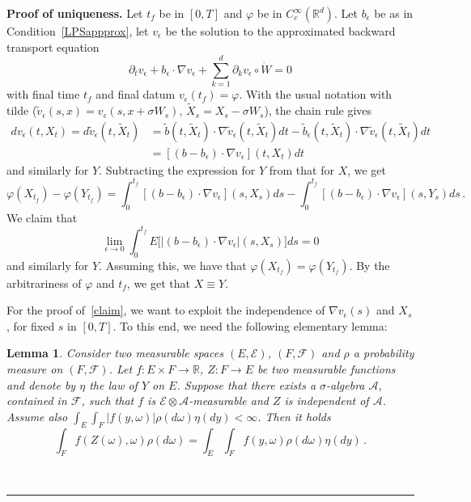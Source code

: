 \documentclass[a4paper,10pt]{article}
\newtheorem{lemma}[theorem]{Lemma}
\newenvironment{proof}[1][Proof]{\noindent\textbf{#1.} }{\ \rule{0.5em}{0.5em}}
\newcommand{\mr}{\mathbb{R}}
\newcommand{\mc}{\mathcal}
\newcommand{\td}{\tilde}
\newcommand{\eps}{\epsilon}
\begin{document}
\begin{proof}[Proof of uniqueness]
Let $t_f$ be in $[0,T]$ and $\varphi$ be in $C^\infty_c(\mr^d)$. Let $b_\eps$ be as in Condition~\ref{LPSappprox}, let $v_\eps$ be the solution to the approximated backward transport equation
\begin{equation*}
\partial_t v_\eps +b_\eps\cdot\nabla v_\eps +\sum^d_{k=1}\partial_k v_\eps\circ\dot{W} =0
\end{equation*}
with final time $t_f$ and final datum $v_\eps(t_f)=\varphi$. With the usual notation with tilde ($\td{v}_\eps(s,x)=v_\eps(s,x+\sigma W_s)$, $\td{X}_s=X_s-\sigma W_s$), the chain rule gives
\begin{align*}
dv_\eps(t,X_t)= d\td{v}_\eps(t,\td{X}_t) & = \td{b}(t,\td{X}_t)\cdot\nabla \td{v}_\eps(t,\td{X}_t)dt -\td{b}_\eps(t,\td{X}_t)\cdot\nabla \td{v}_\eps(t,\td{X}_t)dt \\	
  & = [(b-b_\eps)\cdot\nabla v_\eps](t,X_t)dt
\end{align*}
and similarly for $Y$. Subtracting the expression for $Y$ from that for $X$, we get
\begin{equation*}
\varphi(X_{t_f})-\varphi(Y_{t_f})=\int^{t_f}_0[(b-b_\eps)\cdot\nabla v_\eps](s,X_s)ds-\int^{t_f}_0[(b-b_\eps)\cdot\nabla v_\eps](s,Y_s)ds \,.
\end{equation*}
We claim that
\begin{equation}
\lim_{\eps\rightarrow0}\int^{t_f}_0 E \big[ |(b-b_\eps)\cdot\nabla v_\eps|(s,X_s) \big] ds=0\label{claim}
\end{equation}
and similarly for $Y$. Assuming this, we have that $\varphi(X_{t_f})=\varphi(Y_{t_f})$. By the arbitrariness of $\varphi$ and $t_f$, we get that $X\equiv Y$.

For the proof of~\eqref{claim}, we want to exploit the independence of $\nabla v_\eps(s)$ and $X_s$, for fixed $s$ in $[0,T]$. To this end, we need the following elementary lemma:

\begin{lemma}\label{indep}
Consider two measurable spaces $(E,\mc{E})$, $(F,\mc{F})$ and $\rho$ a probability measure on $(F,\mc{F})$. Let $f \colon E\times F\rightarrow\mr$, $Z \colon F\rightarrow E$ be two measurable functions and denote by $\eta$ the law of $Y$ on $E$. Suppose that there exists a $\sigma$-algebra $\mc{A}$, contained in $\mc{F}$, such that $f$ is $\mc{E}\otimes\mc{A}$-measurable and $Z$ is independent of $\mc{A}$. Assume also $\int_E\int_F|f(y,\omega)|\rho(d\omega)\eta(dy)<\infty$. Then it holds
\begin{equation*}
\int_Ff(Z(\omega),\omega)\rho(d\omega)=\int_E \int_F f(y,\omega) \rho(d\omega) \eta(dy) \,.
\end{equation*}
\end{lemma}


\end{proof}
\end{document}
